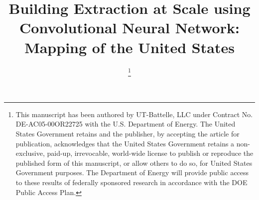 \documentclass[journal]{IEEEtran}
\begin{document}
%
\title{Building Extraction at Scale using Convolutional Neural Network: Mapping of the United States}
%
%
%
\author{%

% 
%
\thanks{This manuscript has been authored by UT-Battelle, LLC under Contract No. DE-AC05-00OR22725 with the U.S. Department of Energy. The United States Government retains and the publisher, by accepting the article for publication, acknowledges that the United States Government retains a non-exclusive, paid-up, irrevocable, world-wide license to publish or reproduce the published form of this manuscript, or allow others to do so, for United States Government purposes. The Department of Energy will provide public access to these results of federally sponsored research in accordance with the DOE Public Access Plan.}

}
\end{document}
